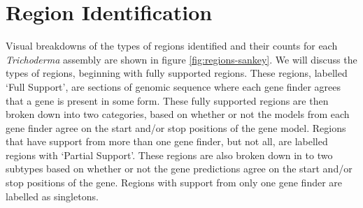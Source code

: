 \section{Region Identification}
\label{section:regions}

Visual breakdowns of the types of regions identified and their counts
for each \textit{Trichoderma} assembly are shown in figure
\ref{fig:regions-sankey}. We will discuss the types of regions,
beginning with fully supported regions. These regions, labelled `Full
Support', are sections of genomic sequence where each gene finder
agrees that a gene is present in some form. These fully supported
regions are then broken down into two categories, based on whether or
not the models from each gene finder agree on the start and/or stop
positions of the gene model. Regions that have support from more than
one gene finder, but not all, are labelled regions with `Partial
Support'. These regions are also broken down in to two subtypes based
on whether or not the gene predictions agree on the start and/or stop
positions of the gene. Regions with support from only one gene finder
are labelled as singletons.

